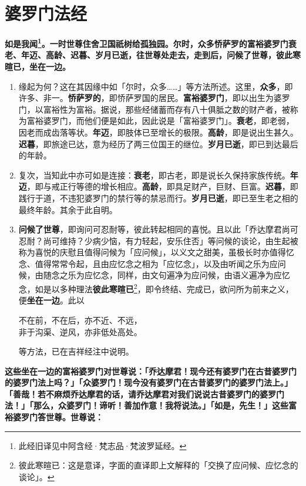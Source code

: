 \section{婆罗门法经}

\textbf{如是我闻\footnote{此经旧译见中阿含经·梵志品·梵波罗延经。}。一时世尊住舍卫国祇树给孤独园。尔时，众多㤭萨罗的富裕婆罗门衰老、年迈、高龄、迟暮、岁月已逝，往世尊处走去，走到后，问候了世尊，彼此寒暄已，坐在一边。}

\begin{enumerate}\item 缘起为何？这在其因缘中如「尔时，众多……」等方法所述。这里，\textbf{众多}，即许多、非一。\textbf{㤭萨罗的}，即㤭萨罗国的居民。\textbf{富裕婆罗门}，即以出生为婆罗门，以富裕性为富裕。据说，那些经储蓄而存有八十俱胝之数的财产者，被称为富裕婆罗门，而他们便是如此，因此说是「富裕婆罗门」。\textbf{衰老}，即老弱，因老而成齿落等状。\textbf{年迈}，即肢体已至增长的极限。\textbf{高龄}，即是说出生甚久。\textbf{迟暮}，即旅途已达，意为经历了两三位国王的继位。\textbf{岁月已逝}，即已到达最后的年龄。
\item 复次，当知此中亦可如是连接：\textbf{衰老}，即古老，即是说长久保持家族传统。\textbf{年迈}，即与戒正行等德的增长相应。\textbf{高龄}，即具足财产，巨财、巨富。\textbf{迟暮}，即践行于道，不违犯婆罗门的禁行等的禁忌而行。\textbf{岁月已逝}，即已至生老之相的最终年龄。其余于此自明。
\item \textbf{问候了世尊}，即询问可忍耐等，彼此转起相同的喜悦。且以此「乔达摩君尚可忍耐？尚可维持？少病少恼，有力轻起，安乐住否」等问候的谈论，由生起被称为喜悦的庆慰且值得问候为「应问候」，以义文之甜美，虽极长时亦值得忆念、值得常常令起，且由应忆念之相为「应忆念」，以及由听闻之乐为应问候，由随念之乐为应忆念，同样，由文句遍净为应问候，由语义遍净为应忆念，如是以多种理法\textbf{彼此寒暄已}\footnote{彼此寒暄已：这是意译，字面的直译即上文解释的「交换了应问候、应忆念的谈论」。}，即令终结、完成已，欲问所为前来之义，便\textbf{坐在一边}。此以\begin{quoting}不在前，不在后，亦不近、不远，\\非于沟渠、逆风，亦非低处高处。\end{quoting}等方法，已在吉祥经注中说明。\end{enumerate}

\textbf{这些坐在一边的富裕婆罗门对世尊说：「乔达摩君！现今还有婆罗门在古昔婆罗门的婆罗门法上吗？」「众婆罗门！现今没有婆罗门在古昔婆罗门的婆罗门法上。」「善哉！若不麻烦乔达摩君的话，请乔达摩君对我们说说古昔婆罗门的婆罗门法！」「那么，众婆罗门！谛听！善加作意！我将说法。」「如是，先生！」这些富裕婆罗门答世尊。世尊说：}

